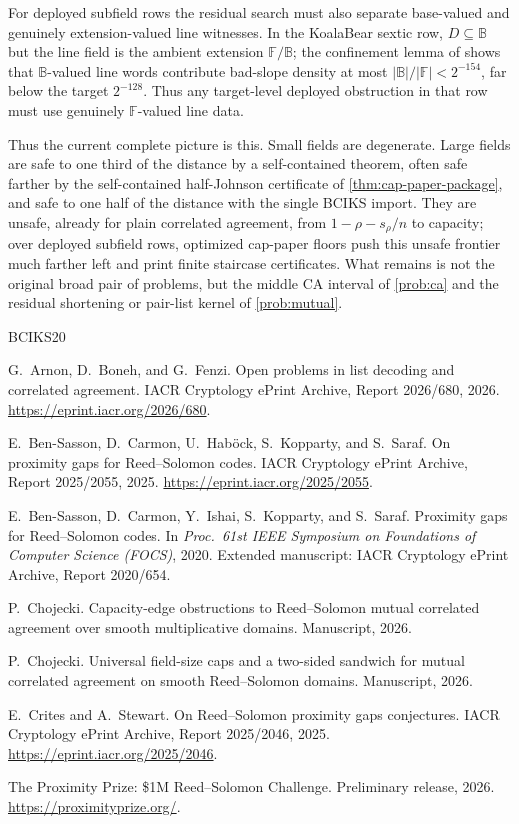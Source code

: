 \documentclass[11pt]{amsart}
\theoremstyle{definition}
\theoremstyle{remark}
\newcommand{\F}{\mathbb{F}}
\newcommand{\B}{\mathbb{B}}
\begin{document}
For deployed subfield rows the residual search must also separate base-valued
and genuinely extension-valued line witnesses.  In the KoalaBear sextic row,
$D\subseteq\B$ but the line field is the ambient extension $\F/\B$; the
confinement lemma of \cite{Cho26b} shows that $\B$-valued line words contribute
bad-slope density at most $|\B|/|\F|<2^{-154}$, far below the target
$2^{-128}$.  Thus any target-level deployed obstruction in that row must use
genuinely $\F$-valued line data.

Thus the current complete picture is this.  Small fields are degenerate.  Large
fields are safe to one third of the distance by a self-contained theorem, often
safe farther by the self-contained half-Johnson certificate of
\cref{thm:cap-paper-package}, and safe to one half of the distance with the
single BCIKS import.  They are unsafe, already for plain correlated agreement,
from $1-\rho-s_\rho/n$ to capacity; over deployed subfield rows, optimized cap-paper
floors push this unsafe frontier much farther left and print finite staircase
certificates.  What remains is not the original broad pair of problems, but the
middle CA interval of \cref{prob:ca} and the residual shortening or pair-list
kernel of \cref{prob:mutual}.

\medskip
\begin{thebibliography}{BCIKS20}

G.~Arnon, D.~Boneh, and G.~Fenzi.
\newblock Open problems in list decoding and correlated agreement.
\newblock IACR Cryptology ePrint Archive, Report 2026/680, 2026.
\newblock \url{https://eprint.iacr.org/2026/680}.

E.~Ben-Sasson, D.~Carmon, U.~Hab{\"o}ck, S.~Kopparty, and S.~Saraf.
\newblock On proximity gaps for Reed--Solomon codes.
\newblock IACR Cryptology ePrint Archive, Report 2025/2055, 2025.
\newblock \url{https://eprint.iacr.org/2025/2055}.

E.~Ben-Sasson, D.~Carmon, Y.~Ishai, S.~Kopparty, and S.~Saraf.
\newblock Proximity gaps for Reed--Solomon codes.
\newblock In \emph{Proc.\ 61st IEEE Symposium on Foundations of Computer Science (FOCS)}, 2020.
\newblock Extended manuscript: IACR Cryptology ePrint Archive, Report 2020/654.

P.~Chojecki.
\newblock Capacity-edge obstructions to Reed--Solomon mutual correlated agreement over smooth multiplicative domains.
\newblock Manuscript, 2026.

P.~Chojecki.
\newblock Universal field-size caps and a two-sided sandwich for mutual correlated agreement on smooth Reed--Solomon domains.
\newblock Manuscript, 2026.

E.~Crites and A.~Stewart.
\newblock On Reed--Solomon proximity gaps conjectures.
\newblock IACR Cryptology ePrint Archive, Report 2025/2046, 2025.
\newblock \url{https://eprint.iacr.org/2025/2046}.

The Proximity Prize: \$1M Reed--Solomon Challenge.
\newblock Preliminary release, 2026.
\newblock \url{https://proximityprize.org/}.

\end{thebibliography}
\end{document}
